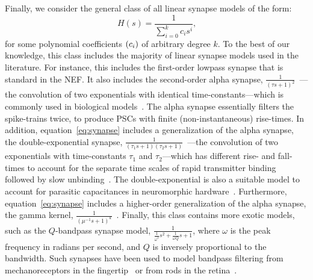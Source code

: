 \documentclass[12pt]{article}
\theoremstyle{definition}
\let\originalleft\left
\let\originalright\right
\renewcommand{\left}{\mathopen{}\mathclose\bgroup\originalleft}
\renewcommand{\right}{\aftergroup\egroup\originalright}
\begin{document}
Finally, we consider the general class of all linear synapse models of the form:
\begin{equation} \label{eq:synapse}
H(s) = \frac{1}{\sum_{i=0}^k c_i s^i} \text{,}
\end{equation}
for some polynomial coefficients $\left( c_i \right)$ of arbitrary degree $k$.
To the best of our knowledge, this class includes the majority of linear synapse models used in the literature.
For instance, this includes the first-order lowpass synapse that is standard in the NEF.
It also includes the second-order alpha synapse, $\frac{1}{(\tau s + 1)^2}$~\citep{rall1967distinguishing}---the convolution of two exponentials with identical time-constants---which is commonly used in biological models~\citep{koch1989methods, destexhe1994synthesis, mainen1995reliability, destexhe1998kinetic, roth2009modeling}.
The alpha synapse essentially filters the spike-trains twice, to produce PSCs with finite (non-instantaneous) rise-times.
In addition, equation~\ref{eq:synapse} includes a generalization of the alpha synapse, the double-exponential synapse, $\frac{1}{(\tau_1 s + 1)(\tau_2 s + 1)}$~\citep{wilson1989simulation}---the convolution of two exponentials with time-constants $\tau_1$ and $\tau_2$---which has different rise- and fall-times to account for the separate time scales of rapid transmitter binding followed by slow unbinding~\citep{destexhe1994synthesis, hausser1997estimating, roth2009modeling}.
The double-exponential is also a suitable model to account for parasitic capacitances in neuromorphic hardware~\citep{voelker2017iscas}.
Furthermore, equation~\ref{eq:synapse} includes a higher-order generalization of the alpha synapse, the gamma kernel, $\frac{1}{(\mu^{-1} s + 1)^k}$~\citep[][equation 19]{de1992gamma}. 
Finally, this class contains more exotic models, such as the $Q$-bandpass synapse model, $\frac{1}{\frac{1}{\omega^2}s^2 + \frac{1}{\omega Q}s + 1}$, where $\omega$ is the peak frequency in radians per second, and $Q$ is inversely proportional to the bandwidth.
Such synapses have been used to model bandpass filtering from mechanoreceptors in the fingertip~\citep{voelker2016a} or from rods in the retina~\citep{armstrong2003bandpass}.
\end{document}
